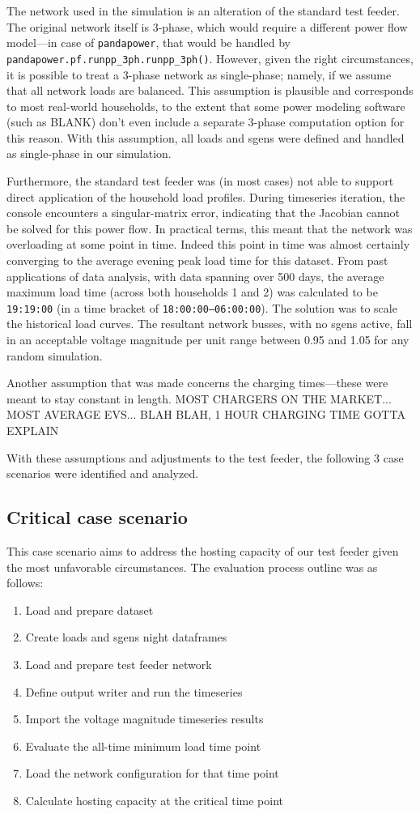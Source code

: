 \documentclass[a4paper,10pt]{report}
\begin{document}
The network used in the simulation is an alteration of the standard test feeder. The original network itself is 3-phase, which would require a different power flow model---in case of \texttt{pandapower}, that would be handled by \texttt{pandapower.pf.runpp\_3ph.runpp\_3ph()}. However, given the right circumstances, it is possible to treat a 3-phase network as single-phase; namely, if we assume that all network loads are balanced. This assumption is plausible and corresponds to most real-world households, to the extent that some power modeling software (such as BLANK) don't even include a separate 3-phase computation option for this reason. With this assumption, all loads and sgens were defined and handled as single-phase in our simulation.

Furthermore, the standard test feeder was (in most cases) not able to support direct application of the household load profiles. During timeseries iteration, the console encounters a singular-matrix error, indicating that the Jacobian cannot be solved for this power flow. In practical terms, this meant that the network was overloading at some point in time. Indeed this point in time was almost certainly converging to the average evening peak load time for this dataset. From past applications of data analysis, with data spanning over 500 days, the average maximum load time (across both households 1 and 2) was calculated to be \texttt{19:19:00} (in a time bracket of \texttt{18:00:00--06:00:00}). The solution was to scale the historical load curves. The resultant network busses, with no sgens active, fall in an acceptable voltage magnitude per unit range between 0.95 and 1.05 for any random simulation.

Another assumption that was made concerns the charging times---these were meant to stay constant in length. MOST CHARGERS ON THE MARKET... MOST AVERAGE EVS... BLAH BLAH, 1 HOUR CHARGING TIME GOTTA EXPLAIN

With these assumptions and adjustments to the test feeder, the following 3 case scenarios were identified and analyzed.

\subsection{Critical case scenario}
This case scenario aims to address the hosting capacity of our test feeder given the most unfavorable circumstances. The evaluation process outline was as follows:
\begin{enumerate}
	\item Load and prepare dataset
	\item Create loads and sgens night dataframes
	\item Load and prepare test feeder network
	\item Define output writer and run the timeseries
	\item Import the voltage magnitude timeseries results
	\item Evaluate the all-time minimum load time point
	\item Load the network configuration for that time point
	\item Calculate hosting capacity at the critical time point
\end{enumerate}
\end{document}
